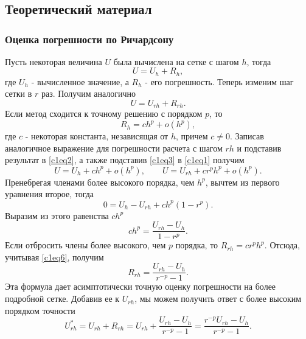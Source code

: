 \chapter{}

\section{Теоретический материал}

\subsection{Оценка погрешности по Ричардсону}
Пусть некоторая величина $U$ была вычислена на сетке с шагом $h$, тогда
\begin{equation} \label{c1eq1}
	U = U_h + R_h,
\end{equation}
где $U_h$ - вычисленное значение, а $R_h$ - его погрешность. Теперь изменим шаг сетки в $r$ раз. Получим аналогично
\begin{equation} \label{c1eq2}
	U = U_{rh} + R_{rh}.
\end{equation}
Если метод сходится к точному решению с порядком $p$, то
\begin{equation} \label{c1eq3}
	R_h = ch^p + o(h^p),
\end{equation}
где $c$ - некоторая константа, независящая от $h$, причем $c \neq 0$.
Записав аналогичное выражение для погрешности расчета с шагом $rh$ и подставив результат в \eqref{c1eq2}, а также подставив \eqref{c1eq3} в \eqref{c1eq1} получим
\begin{equation} \label{c1eq4}
	U = U_h + ch^p + o(h^p),
	\qquad 
	U = U_{rh} + cr^ph^p + o(h^p).
\end{equation}
Пренебрегая членами более высокого порядка, чем $h^p$, вычтем из первого уравнения второе, тогда
\begin{equation} \label{c1eq5}
	0 = U_h - U_{rh} + ch^p(1-r^p).
\end{equation}
Выразим из этого равенства $ch^p$
\begin{equation} \label{c1eq6}
	ch^p = \frac{U_{rh} - U_h}{1 - r^p}.
\end{equation}
Если отбросить члены более высокого, чем $p$ порядка, то $R_{rh} = cr^ph^p$. Отсюда, учитывая \eqref{c1eq6}, получим
\begin{equation} \label{c1eq7}
	R_{rh} = \frac{U_{rh} - U_h}{r^{-p} - 1}.
\end{equation}
Эта формула дает асимптотически точную оценку погрешности на более подробной сетке. Добавив ее к $U_{rh}$, мы можем получить ответ с более высоким порядком точности
\begin{equation} \label{c1eq8}
	U_{rh}^* = U_{rh} + R_{rh} = U_{rh} + \frac{U_{rh} - U_h}{r^{-p} - 1} = \frac{r^{-p}U_{rh} - U_h}{r^{-p} - 1}.
\end{equation}

